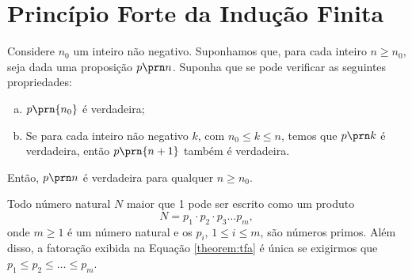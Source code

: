 \section{Princípio Forte da Indução Finita}

\begin{theorem}
Considere $n_0$ um inteiro não negativo. Suponhamos que, para cada inteiro $n \ge n_0$, seja dada uma proposição $p \prn n$. Suponha que se pode verificar as seguintes propriedades:
%
\begin{enumerate}[(a)]
  \item $p \prn{n_0}$ é verdadeira;
  \item Se para cada inteiro não negativo $k$, com $n_0 \le k \le n$, temos que
   $p \prn k$ é verdadeira, então $p \prn {n+1}$ também
  é verdadeira.
\end{enumerate}
%
Então, $p \prn n$ é verdadeira para qualquer $n \ge n_0$.
\end{theorem}

\begin{theorem}
Todo número natural $N$ maior que 1 pode ser escrito como um produto
%
\begin{equation}
\label{theorem:tfa}
N = p_1 \cdot p_2 \cdot p_3 \dots p_m,
\end{equation}
%
onde $m \ge 1$ é um número natural e os $p_i$, $1 \le i \le m$, são números primos.
Além disso, a fatoração exibida na Equação \ref{theorem:tfa} é única se exigirmos que $p_1 \le p_2 \le \dots \le p_m$.
\end{theorem}

